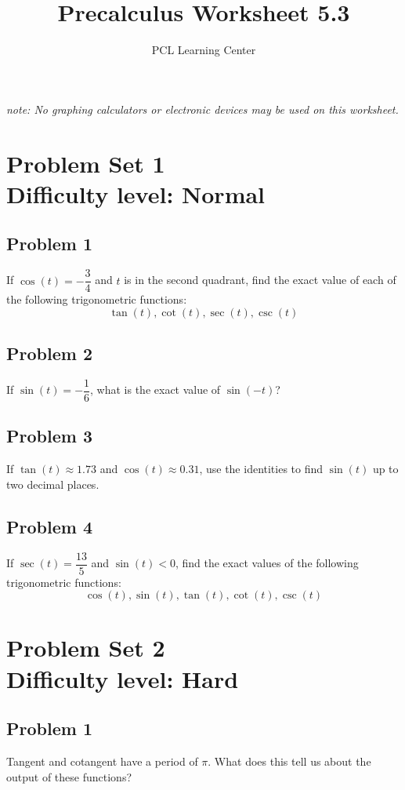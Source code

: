 \documentclass[12pt]{article}
\title{Precalculus Worksheet 5.3}
\author{PCL Learning Center}
\date{}
\begin{document}
\maketitle

\begin{center}
    \textit{note: No graphing calculators or electronic devices may be used on this worksheet.}    
\end{center}

\section*{Problem Set 1\\Difficulty level: Normal}
\subsection*{Problem 1}
If \(\cos(t)=-\dfrac{3}{4}\) and \(t\) is in the second quadrant, find the exact value of each of the following trigonometric functions:
\[\tan(t),\cot(t),\sec(t),\csc(t)\]

\subsection*{Problem 2}
If \(\sin(t)=-\dfrac{1}{6}\), what is the exact value of \(\sin(-t)\)?\\

\subsection*{Problem 3}
If \(\tan(t) \approx 1.73 \) and \(\cos(t) \approx 0.31\), use the identities to find \(\sin(t)\) up to two decimal places.

\subsection*{Problem 4}
If \(\sec(t)=\dfrac{13}{5}\) and \(\sin(t)<0\), find the exact values of the following trigonometric functions:
\[\cos(t),\sin(t),\tan(t),\cot(t),\csc(t)\]

\newpage
\section*{Problem Set 2\\Difficulty level: Hard}
\subsection*{Problem 1}
Tangent and cotangent have a period of \(\pi\). What does this tell us about the output of these functions?
\end{document}
